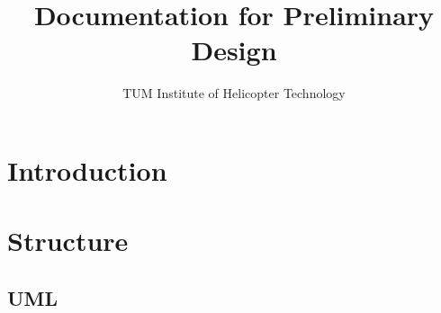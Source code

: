 \documentclass[11pt, titlepage, a4paper, parskip=true]{scrbook}
\begin{document}
\title{Documentation for Preliminary Design}
\author{TUM Institute of Helicopter Technology}
\maketitle
{}
\tableofcontents
\clearpage
{}

\chapter{Introduction}

\chapter{Structure}

\section{UML}
\end{document}
